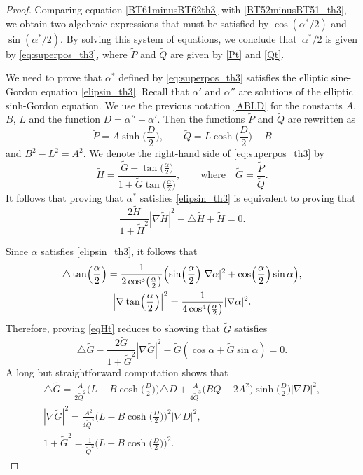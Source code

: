 \documentclass[pdftex]{sigma}
\numberwithin{equation}{section}
\begin{document}
\begin{proof}
Comparing equation \eqref{BT61minusBT62th3} with \eqref{BT52minusBT51_th3}, we obtain two algebraic
expressions that must be satisfied by $\cos(\alpha^*/2)$ and $\sin(\alpha^*/2)$.
By solving this system of equations, we conclude that~$\alpha^*/2$ is given by \eqref{eq:superpos_th3}, where $\tilde{P}$ and $\tilde{Q}$ are given by \eqref{Pt} and \eqref{Qt}.

 We need to prove that $\alpha^*$ defined by \eqref{eq:superpos_th3} satisfies the elliptic sine-Gordon equation \eqref{elipsin_th3}.
Recall that $\alpha'$ and $\alpha''$ are solutions of the elliptic sinh-Gordon equation. We use the previous notation \eqref{ABLD} for the constants
$A$, $B$, $L$ and the function $D=\alpha''-\alpha'$.
Then the functions $\tilde{P}$ and $\tilde{Q}$ are rewritten as
\begin{equation*}%
\tilde{P}=A\sinh\biggl(\frac{D}{2}\biggr),\qquad \tilde{Q}=L\cosh\biggl(\frac{D}{2}\biggr)-B
\end{equation*}
and $B^2-L^2=A^2$.
We denote the right-hand side of \eqref{eq:superpos_th3} by
\begin{equation*}%
\tilde{H}=\frac{\tilde{G}-\tan\bigl(\frac{\alpha}{2}\bigr)}{1+\tilde{G}\tan\bigl(\frac{\alpha}{2}\bigr)}, \qquad \mbox{where}\quad \tilde{G}=\frac{\tilde{P}}{\tilde{Q}}.
\end{equation*}
It follows that proving that $\alpha^*$ satisfies \eqref{elipsin_th3} is equivalent to proving that
\begin{equation}\label{eqHt}
\frac{2\tilde{H}}{1+\tilde{H}^2}|\nabla \tilde{H}|^2- \triangle \tilde{H}+\tilde{H}=0.
\end{equation}

Since $\alpha$ satisfies \eqref{elipsin_th3}, it follows that
\begin{gather*}
\triangle \tan \Bigl(\frac{\alpha}{2}\Bigr)= \frac{1}{2\cos^3\bigl(\frac{\alpha}{2}\bigr)}\Bigl(\sin \Bigl(\frac{\alpha}{2}\Bigr) |\nabla\alpha|^2+\cos\Bigl(\frac{\alpha}{2}\Bigr)\sin\alpha\Bigr), \\
\Bigl|\nabla\tan\Bigl(\frac{\alpha}{2}\Bigr)\Bigr|^2=\frac{1}{4\cos^4 \bigl(\frac{\alpha}{2}\bigr)}
|\nabla \alpha|^2.
\end{gather*}
Therefore, proving \eqref{eqHt} reduces to showing that $\tilde{G}$
satisfies
\begin{equation}\label{eqGt}
\triangle \tilde{G}-\frac{2\tilde{G}}{1+\tilde{G}^2}|\nabla\tilde{G}|^2-\tilde{G}(\cos \alpha +\tilde{G}\sin \alpha)=0.
\end{equation}
A long but straightforward computation shows that
\begin{gather*}
 \triangle \tilde{G} = \frac{A}{2 \tilde{Q}^2}\biggl(L-B\cosh\biggl(\frac{D}{2}\biggr) \biggr) {\triangle D}
+\frac{A}{4\tilde{Q}^3}\bigl(B\tilde{Q}-2A^2\bigr)\sinh\biggl(\frac{D}{2}\biggr)|\nabla D|^2,\\
 |\nabla \tilde{G}|^2 = \frac{A^2}{4 \tilde{Q}^4}\biggl(L-B\cosh\biggl(\frac{D}{2}\biggr) \biggr)^2|\nabla D|^2,\\
 1+\tilde{G}^2 = \frac{1}{\tilde{Q}^2}\biggl(L-B\cosh\biggl(\frac{D}{2}\biggr) \biggr)^2.
\end{gather*}


\end{proof}
\end{document}
